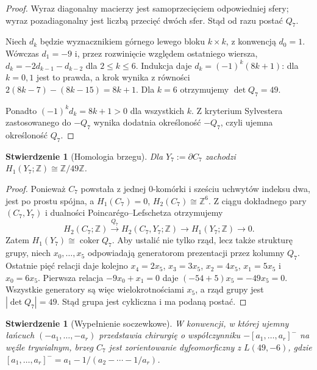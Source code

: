 \documentclass[11pt,a4paper]{report}
\numberwithin{equation}{section}
\theoremstyle{plain}
\newtheorem{stwierdzenie}[twierdzenie]{Stwierdzenie}
\theoremstyle{definition}
\theoremstyle{remark}
\begin{document}
\begin{proof}
Wyraz diagonalny macierzy jest samoprzecięciem
odpowiedniej sfery; wyraz pozadiagonalny jest liczbą
przecięć dwóch sfer. Stąd od razu postać $Q_7$.

Niech $d_k$ będzie wyznacznikiem górnego lewego bloku
$k\times k$, z konwencją $d_0=1$. Wówczas
$d_1=-9$ i, przez rozwinięcie względem ostatniego wiersza,
$d_k=-2d_{k-1}-d_{k-2}$ dla $2\le k\le6$.
Indukcja daje $d_k=(-1)^k(8k+1)$: dla $k=0,1$
jest to prawda, a krok wynika z równości
$2(8k-7)-(8k-15)=8k+1$.
Dla $k=6$ otrzymujemy $\det Q_7=49$.

Ponadto $(-1)^k d_k=8k+1>0$ dla wszystkich $k$.
Z kryterium Sylvestera zastosowanego do $-Q_7$
wynika dodatnia określoność $-Q_7$, czyli ujemna
określoność $Q_7$.
\end{proof}

\begin{stwierdzenie}[Homologia brzegu]
\label{prop:tg-park-h1-boundary}
Dla $Y_7:=\partial C_7$ zachodzi
$H_1(Y_7;\mathbb Z)\cong\mathbb Z/49\mathbb Z$.
\end{stwierdzenie}

\begin{proof}
Ponieważ $C_7$ powstała z jednej $0$-komórki i sześciu
uchwytów indeksu dwa, jest po prostu spójna, a
$H_1(C_7)=0$, $H_2(C_7)\cong\mathbb Z^6$. Z ciągu
dokładnego pary $(C_7,Y_7)$ i dualności Poincarégo--Lefschetza
otrzymujemy
\[
H_2(C_7;\mathbb Z)\xrightarrow{Q_7}
H_2(C_7,Y_7;\mathbb Z)\longrightarrow
H_1(Y_7;\mathbb Z)\longrightarrow0.
\]
Zatem $H_1(Y_7)\cong\operatorname{coker}Q_7$.
Aby ustalić nie tylko rząd, lecz także strukturę grupy,
niech $x_0,\ldots,x_5$ odpowiadają generatorom prezentacji
przez kolumny $Q_7$. Ostatnie pięć relacji daje kolejno
$x_4=2x_5$, $x_3=3x_5$, $x_2=4x_5$,
$x_1=5x_5$ i $x_0=6x_5$.
Pierwsza relacja $-9x_0+x_1=0$ daje
$(-54+5)x_5=-49x_5=0$.
Wszystkie generatory są więc wielokrotnościami $x_5$,
a rząd grupy jest $|\det Q_7|=49$. Stąd grupa jest
cykliczna i ma podaną postać.
\end{proof}

\begin{stwierdzenie}[Wypełnienie soczewkowe]
\label{prop:tg-park-lens}
W konwencji, w której ujemny łańcuch $(-a_1,\ldots,-a_r)$
przedstawia chirurgię o współczynniku
$- [a_1,\ldots,a_r]^-$ na węźle trywialnym,
brzeg $C_7$ jest zorientowanie dyfeomorficzny z
$L(49,-6)$, gdzie
$[a_1,\ldots,a_r]^-=a_1-1/(a_2-\cdots-1/a_r)$.
\end{stwierdzenie}
\end{document}
